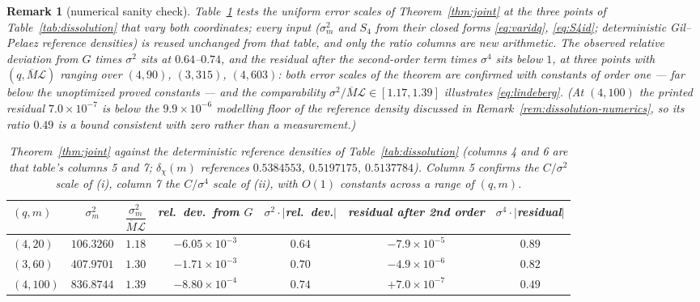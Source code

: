 \documentclass[11pt]{article}
\newtheorem{remark}{Remark}
\begin{document}
\begin{remark}[numerical sanity check]\label{rem:joint-numerics}
Table~\ref{tab:joint} tests the uniform error scales of
Theorem~\ref{thm:joint} at the three points of
Table~\ref{tab:dissolution} that vary both coordinates; every input
($\sigma_m^2$ and $S_4$ from their closed forms \eqref{eq:varidq},
\eqref{eq:S4id}; deterministic Gil--Pelaez reference densities) is
reused unchanged from that table, and only the ratio columns are new
arithmetic. The observed relative deviation from $G$ times $\sigma^2$
sits at $0.64$--$0.74$, and the residual after the second-order term
times $\sigma^4$ sits below $1$, at three points with
$(q,\overline M\mathcal L)$ ranging over $(4,90)$, $(3,315)$,
$(4,603)$: both error scales of the theorem are confirmed with
constants of order one --- far below the unoptimized proved constants
--- and the comparability $\sigma^2/\overline M\mathcal L\in[1.17,1.39]$
illustrates \eqref{eq:lindeberg}. (At $(4,100)$ the printed residual
$7.0\times10^{-7}$ is below the $9.9\times10^{-6}$ modelling floor of
the reference density discussed in
Remark~\ref{rem:dissolution-numerics}, so its ratio $0.49$ is a bound
consistent with zero rather than a measurement.)

\begin{table}[h]\centering
\begin{tabular}{lcccccc}
\toprule
$(q,m)$ & $\sigma_m^2$ & $\dfrac{\sigma_m^2}{\overline M\mathcal L}$ &
rel.\ dev.\ from $G$ & $\sigma^2\cdot|$rel.\ dev.$|$ &
residual after 2nd order & $\sigma^4\cdot|$residual$|$ \\
\midrule
$(4,20)$  & $106.3260$ & $1.18$ & $-6.05\times10^{-3}$ & $0.64$ & $-7.9\times10^{-5}$ & $0.89$ \\
$(3,60)$  & $407.9701$ & $1.30$ & $-1.71\times10^{-3}$ & $0.70$ & $-4.9\times10^{-6}$ & $0.82$ \\
$(4,100)$ & $836.8744$ & $1.39$ & $-8.80\times10^{-4}$ & $0.74$ & $+7.0\times10^{-7}$ & $0.49$ \\
\bottomrule
\end{tabular}
\caption{Theorem~\ref{thm:joint} against the deterministic reference
densities of Table~\ref{tab:dissolution} (columns 4 and 6 are that
table's columns 5 and 7; $\delta_\chi(m)$ references
$0.5384553$, $0.5197175$, $0.5137784$). Column 5 confirms the
$C/\sigma^2$ scale of (i), column 7 the $C/\sigma^4$ scale of (ii),
with $O(1)$ constants across a range of $(q,m)$.}
\label{tab:joint}
\end{table}
\end{remark}
\end{document}
